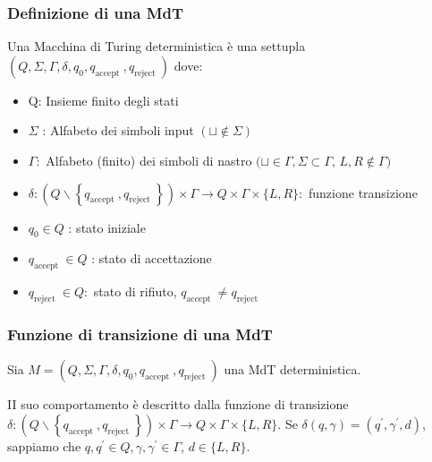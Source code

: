 \subsubsection{Definizione di una MdT}

Una Macchina di Turing deterministica è una settupla
$\left(Q, \Sigma, \Gamma, \delta, q_{0}, q_{\text {accept }}, q_{\text {reject }}\right)$
dove:
\begin{itemize}
    \item Q: Insieme finito degli stati
    \item $\Sigma$ : Alfabeto dei simboli input $(\sqcup \notin \Sigma)$
    \item $\Gamma:$ Alfabeto (finito) dei simboli di nastro $(\sqcup \in \Gamma, \Sigma \subset \Gamma$, $L, R \notin \Gamma)$
    \item $\delta:\left(Q \backslash\left\{q_{\text {accept }}, q_{\text {reject }}\right\}\right) \times \Gamma \rightarrow Q \times \Gamma \times\{L, R\}:$ funzione transizione
    \item  $q_{0} \in Q$ : stato iniziale
\item $q_{\text {accept }} \in Q$ : stato di accettazione
\item $q_{\text {reject }} \in Q:$ stato di rifiuto, $q_{\text {accept }} \neq q_{\text {reject }}$
\end{itemize}

\subsubsection{Funzione di transizione di una MdT}

Sia $M=\left(Q, \Sigma, \Gamma, \delta, q_{0}, q_{\text {accept }}, q_{\text {reject }}\right)$ una MdT deterministica.

II suo comportamento è descritto dalla funzione di transizione
$\delta:\left(Q \backslash\left\{q_{\text {accept }}, q_{\text {reject }}\right\}\right) \times \Gamma \rightarrow Q \times \Gamma \times\{L, R\} .$
Se $\delta(q, \gamma)=\left(q^{\prime}, \gamma^{\prime}, d\right)$, sappiamo che $q, q^{\prime} \in Q, \gamma, \gamma^{\prime} \in \Gamma$, $d \in\{L, R\} .$

\vspace{5mm}

